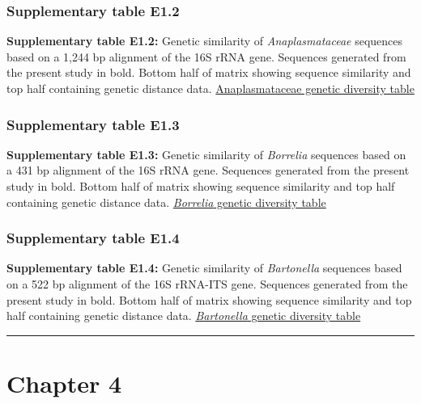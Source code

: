 \documentclass[a4paper, nobind]{templates/ociamthesis}
\begin{document}
\hypertarget{supplementary-table-e1.2}{%
\subsubsection{Supplementary table E1.2}\label{supplementary-table-e1.2}}

\textbf{Supplementary table E1.2:} Genetic similarity of \emph{Anaplasmataceae} sequences based on a 1,244 bp alignment of the 16S rRNA gene. Sequences generated from the present study in bold. Bottom half of matrix showing sequence similarity and top half containing genetic distance data.
\href{https://ndownloader.figshare.com/files/27452720}{Anaplasmataceae genetic diversity table}

\hypertarget{supplementary-table-e1.3}{%
\subsubsection{Supplementary table E1.3}\label{supplementary-table-e1.3}}

\textbf{Supplementary table E1.3:} Genetic similarity of \emph{Borrelia} sequences based on a 431 bp alignment of the 16S rRNA gene. Sequences generated from the present study in bold. Bottom half of matrix showing sequence similarity and top half containing genetic distance data.
\href{https://figshare.com/ndownloader/files/35862953}{\emph{Borrelia} genetic diversity table}

\hypertarget{supplementary-table-e1.4}{%
\subsubsection{Supplementary table E1.4}\label{supplementary-table-e1.4}}

\textbf{Supplementary table E1.4:} Genetic similarity of \emph{Bartonella} sequences based on a 522 bp alignment of the 16S rRNA-ITS gene. Sequences generated from the present study in bold. Bottom half of matrix showing sequence similarity and top half containing genetic distance data.
\href{https://ndownloader.figshare.com/files/27452723}{\emph{Bartonella} genetic diversity table}

\begin{center}\rule{0.5\linewidth}{0.5pt}\end{center}

\clearpage

\hypertarget{ch4-supp}{%
\section{Chapter 4}\label{ch4-supp}}
\end{document}
